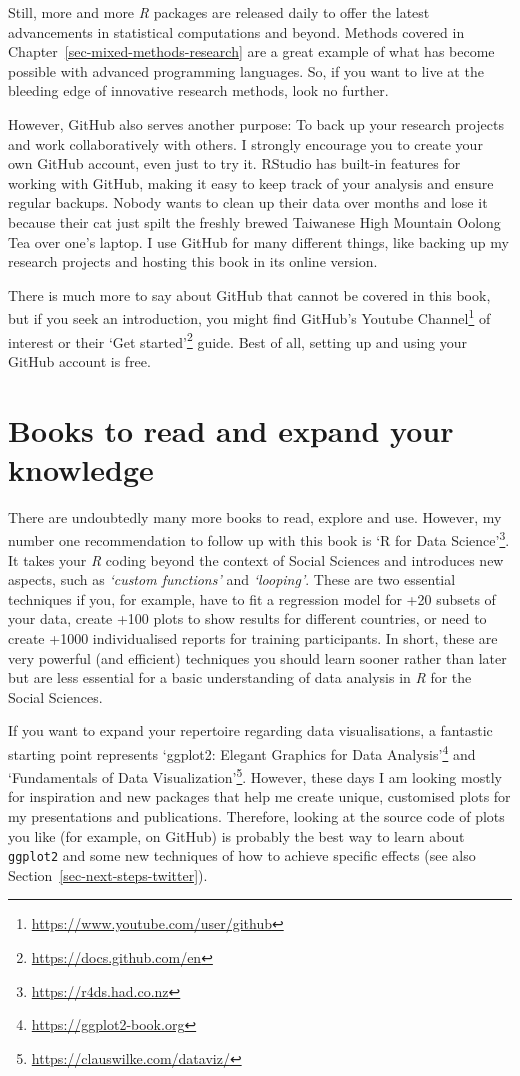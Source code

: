\documentclass[
  letterpaper,
]{krantz}
\renewcommand{\href}[2]{#2\footnote{\url{#1}}}
\begin{document}
Still, more and more \emph{R} packages are released daily to offer the
latest advancements in statistical computations and beyond. Methods
covered in Chapter~\ref{sec-mixed-methods-research} are a great example
of what has become possible with advanced programming languages. So, if
you want to live at the bleeding edge of innovative research methods,
look no further.

However, GitHub also serves another purpose: To back up your research
projects and work collaboratively with others. I strongly encourage you
to create your own GitHub account, even just to try it. RStudio has
built-in features for working with GitHub, making it easy to keep track
of your analysis and ensure regular backups. Nobody wants to clean up
their data over months and lose it because their cat just spilt the
freshly brewed Taiwanese High Mountain Oolong Tea over one's laptop. I
use GitHub for many different things, like backing up my research
projects and hosting this book in its online version.

There is much more to say about GitHub that cannot be covered in this
book, but if you seek an introduction, you might find
\href{https://www.youtube.com/user/github}{GitHub's Youtube Channel} of
interest or their \href{https://docs.github.com/en}{`Get started'}
guide. Best of all, setting up and using your GitHub account is free.

\section{Books to read and expand your
knowledge}\label{sec-next-steps-books}

There are undoubtedly many more books to read, explore and use. However,
my number one recommendation to follow up with this book is
\href{https://r4ds.had.co.nz}{`R for Data Science'}. It takes your
\emph{R} coding beyond the context of Social Sciences and introduces new
aspects, such as \emph{`custom functions'} and \emph{`looping'}. These
are two essential techniques if you, for example, have to fit a
regression model for +20 subsets of your data, create +100 plots to show
results for different countries, or need to create +1000 individualised
reports for training participants. In short, these are very powerful
(and efficient) techniques you should learn sooner rather than later but
are less essential for a basic understanding of data analysis in
\emph{R} for the Social Sciences.

If you want to expand your repertoire regarding data visualisations, a
fantastic starting point represents
\href{https://ggplot2-book.org}{`ggplot2: Elegant Graphics for Data
Analysis'} and \href{https://clauswilke.com/dataviz/}{`Fundamentals of
Data Visualization'}. However, these days I am looking mostly for
inspiration and new packages that help me create unique, customised
plots for my presentations and publications. Therefore, looking at the
source code of plots you like (for example, on GitHub) is probably the
best way to learn about \texttt{ggplot2} and some new techniques of how
to achieve specific effects (see also
Section~\ref{sec-next-steps-twitter}).
\end{document}
